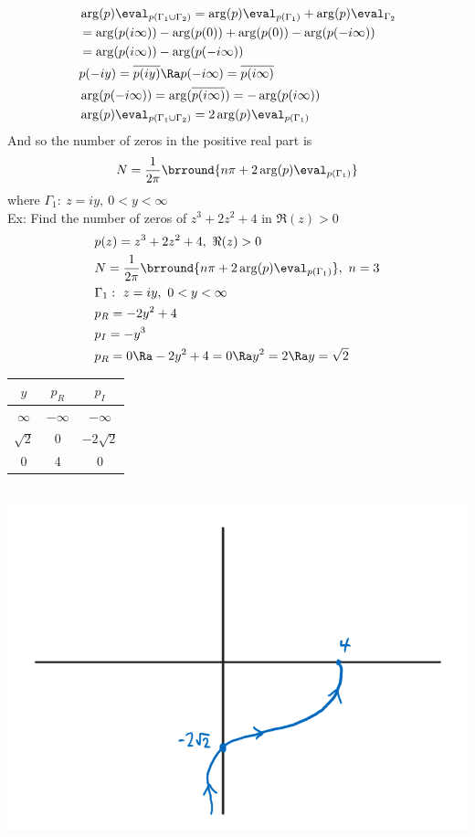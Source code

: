 \begin{align*}
    &\arg(p)\eval_{p(\Gamma_1\cup\Gamma_2)}=\arg(p)\eval_{p(\Gamma_1)}+\arg(p)\eval_{\Gamma_2}\\
    &=\arg(p(i\infty))-\arg(p(0))+\arg(p(0))-\arg(p(-i\infty))\\
    &=\arg(p(i\infty))-\arg(p(-i\infty))\\
    &p(-iy)=\overline{p(iy)}\Ra p(-i\infty)=\overline{p(i\infty)}\\
    &\arg(p(-i\infty))=\arg(\overline{p(i\infty)})=-\arg(p(i\infty))\\
    &\arg(p)\eval_{p(\Gamma_1\cup\Gamma_2)}=2\arg(p)\eval_{p(\Gamma_1)}
\end{align*}
And so the number of zeros in the positive real part is
\[N=\frac{1}{2\pi}\brround{n\pi+2\arg(p)\eval_{p(\Gamma_1)}}\]
where $\Gamma_1:\ z=iy,\ 0<y<\infty$\\
Ex: Find the number of zeros of $z^3+2z^2+4$ in $\Re(z)>0$
\begin{align*}
    &p(z)=z^3+2z^2+4,\ \Re(z)>0\\
    &N=\frac{1}{2\pi}\brround{n\pi+2\arg(p)\eval_{p(\Gamma_1)}},\ n=3\\
    &\Gamma_1:\ z=iy,\ 0<y<\infty\\
    &p_R=-2y^2+4\\
    &p_I=-y^3\\
    &p_R=0\Ra -2y^2+4=0\Ra y^2=2\Ra y=\sqrt{2}
\end{align*}
\begin{tabular}{c|c|c}
    $y$ & $p_R$ & $p_I$\\
    \hline
    $\infty$ & $-\infty$ & $-\infty$\\
    $\sqrt{2}$ & 0 & $-2\sqrt{2}$\\
    0 & 4 & 0
\end{tabular}\\
\includegraphics[scale=0.5]{Images/ComplexAnalysisPictures/Q5.png}
